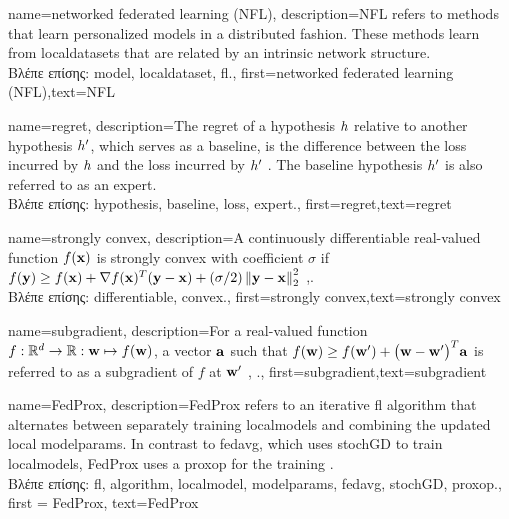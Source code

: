 {name={networked federated learning (NFL)},
	description={NFL refers 
		to methods that learn personalized \gls{model}s in a distributed fashion. These methods learn from \gls{localdataset}s 
		that are related by an intrinsic network structure.\\
		\foreignlanguage{greek}{Βλέπε επίσης:} \gls{model}, \gls{localdataset}, \gls{fl}.},
 first={networked federated learning (NFL)},text={NFL} 
}

{name={regret},
	description={The regret of a \gls{hypothesis} $h$ relative to 
		another \gls{hypothesis} $h'$, which serves as a \gls{baseline}, 
		is the difference between the \gls{loss} incurred by $h$ and the \gls{loss} 
		incurred by $h'$ \cite{PredictionLearningGames}. 
		The \gls{baseline} \gls{hypothesis} $h'$ is also referred to as an \gls{expert}.\\
		\foreignlanguage{greek}{Βλέπε επίσης:} \gls{hypothesis}, \gls{baseline}, \gls{loss}, \gls{expert}.},
	first={regret},text={regret} 
}

{name={strongly convex},
	description={A continuously \gls{differentiable} real-valued 
		function $f({\bf x})$ is strongly \gls{convex} with coefficient $\sigma$ if $f({\bf y}) \geq f({\bf x}) + \nabla f({\bf x})^{T} ({\bf y} - {\bf x}) + (\sigma/2) \left\Vert {{\bf y}- {\bf x}} \right\Vert_{2}^{2}$ \cite{nesterov04},\cite[Sec. B.1.1]{CvxAlgBertsekas}.\\
		\foreignlanguage{greek}{Βλέπε επίσης:} \gls{differentiable}, \gls{convex}.},
	first={strongly convex},text={strongly convex} 
}

{name={subgradient},
description={For a real-valued function $f: \mathbb{R}^{d} \rightarrow \mathbb{R}: {\bf w} \mapsto f({\bf w})$, 
		a vector ${\bf a}$ such that $f({\bf w}) \geq  f({\bf w}') +\big({\bf w}-{\bf w}' \big)^{T} {\bf a}$ is 
		referred to as a subgradient of $f$ at ${\bf w}'$ \cite{BertCvxAnalOpt}, \cite{BertsekasNonLinProgr}.},
	first={subgradient},text={subgradient} 
}

{name={FedProx},
	description={FedProx refers to an iterative \gls{fl} \gls{algorithm} that alternates between separately training \gls{localmodel}s and combining the updated local \gls{modelparams}. In contrast to \gls{fedavg}, which uses 
		\gls{stochGD} to train \gls{localmodel}s, FedProx uses a \gls{proxop} for the training \cite{FedProx2020}.\\
		\foreignlanguage{greek}{Βλέπε επίσης:} \gls{fl}, \gls{algorithm}, \gls{localmodel}, \gls{modelparams}, \gls{fedavg}, \gls{stochGD}, \gls{proxop}.}, 
	first = {FedProx}, text={FedProx} 
}

